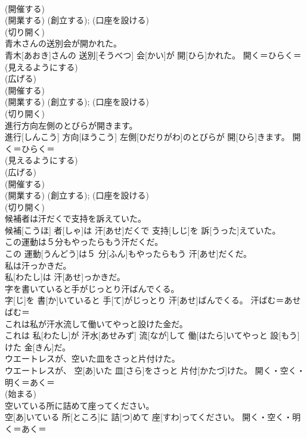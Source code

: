 \documentclass[8pt]{extreport}
\begin{document}
\begin{CJK}{UTF8}{min}
{\\	(開催する) 
\\	(開業する) (創立する); (口座を設ける) 
\\	(切り開く) 
\\	青木さんの送別会が開かれた。	
\\	青木[あおき]さんの 送別[そうべつ] 会[かい]が 開[ひら]かれた。	開く＝ひらく＝ 
\\	(見えるようにする) 
\\	(広げる) 
\\	(開催する) 
\\	(開業する) (創立する); (口座を設ける) 
\\	(切り開く) 
\\	進行方向左側のとびらが開きます。	
\\	進行[しんこう] 方向[ほうこう] 左側[ひだりがわ]のとびらが 開[ひら]きます。	開く＝ひらく＝ 
\\	(見えるようにする) 
\\	(広げる) 
\\	(開催する) 
\\	(開業する) (創立する); (口座を設ける) 
\\	(切り開く) 
\\	候補者は汗だくで支持を訴えていた。	
\\	候補[こうほ] 者[しゃ]は 汗[あせ]だくで 支持[しじ]を 訴[うった]えていた。	
\\	この運動は５分もやったらもう汗だくだ。	
\\	この 運動[うんどう]は５ 分[ふん]もやったらもう 汗[あせ]だくだ。	
\\	私は汗っかきだ。	
\\	私[わたし]は 汗[あせ]っかきだ。	
\\	字を書いていると手がじっとり汗ばんでくる。	
\\	字[じ]を 書[か]いていると 手[て]がじっとり 汗[あせ]ばんでくる。	汗ばむ＝あせばむ＝ 
\\	これは私が汗水流して働いてやっと設けた金だ。	
\\	これは 私[わたし]が 汗水[あせみず] 流[なが]して 働[はたら]いてやっと 設[もう]けた 金[きん]だ。	
\\	ウエートレスが、空いた皿をさっと片付けた。	
\\	ウエートレスが、 空[あ]いた 皿[さら]をさっと 片付[かたづ]けた。	開く・空く・明く＝あく＝ 
\\	(始まる) 
\\	空いている所に詰めて座ってください。	
\\	空[あ]いている 所[ところ]に 詰[つ]めて 座[すわ]ってください。	開く・空く・明く＝あく＝ 
}
\end{CJK}
\end{document}
